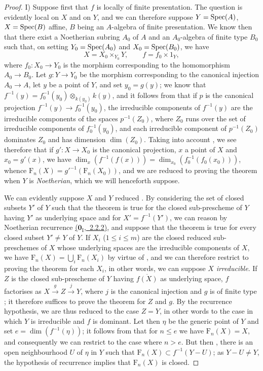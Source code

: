 \begin{proof}
I) Suppose first that $f$ is locally of finite presentation.
The question is evidently local on $X$ and on $Y$, and we can therefore suppose $Y=\operatorname{Spec}(A)$, $X=\operatorname{Spec}(B)$ affine, $B$ being an $A$-algebra of finite presentation.
We know then  that there exist a Noetherian subring $A_0$ of $A$ and an $A_0$-algebra of finite type $B_0$ such that, on setting $Y_0=\operatorname{Spec}(A_0)$ and $X_0=\operatorname{Spec}(B_0)$, we have
\[
X=X_0\times_{Y_0}Y,\qquad f=f_0\times 1_Y,
\]
where $f_0:X_0\to Y_0$ is the morphism corresponding to the homomorphism $A_0\to B_0$.
Let $g:Y\to Y_0$ be the morphism corresponding to the canonical injection $A_0\to A$, let $y$ be a point of $Y$, and set $y_0=g(y)$; we know that $f^{-1}(y)=f_0^{-1}(y_0)\otimes_{k(y_0)}k(y)$, and it follows from  that if $p$ is the canonical projection $f^{-1}(y)\to f_0^{-1}(y_0)$, the irreducible components of $f^{-1}(y)$ are the irreducible components of the spaces $p^{-1}(Z_0)$, where $Z_0$ runs over the set of irreducible components of $f_0^{-1}(y_0)$, and each irreducible component of $p^{-1}(Z_0)$ dominates $Z_0$ and has dimension $\dim(Z_0)$.
Taking into account , we see therefore that if $g':X\to X_0$ is the canonical projection, $x$ a point of $X$ and $x_0=g'(x)$, we have $\dim_x(f^{-1}(f(x)))=\dim_{x_0}(f_0^{-1}(f_0(x_0)))$, whence $\mathrm{F}_n(X)={g'}^{-1}(\mathrm{F}_n(X_0))$, and we are reduced to proving the theorem when $Y$ is \emph{Noetherian}, which we will henceforth suppose.

We can evidently suppose $X$ and $Y$ reduced .
By considering the set of closed subsets $Y'$ of $Y$ such that the theorem is true for the closed sub-prescheme of $Y$ having $Y'$ as underlying space and for $X'=f^{-1}(Y')$, we can reason by Noetherian recurrence \hyperref[0.2.2.2]{($\mathbf{0}_{\mathrm{I}}$,~2.2.2)}, and suppose that the theorem is true for every closed subset $Y'\neq Y$ of $Y$.
If $X_i$ ($1\leq i\leq m$) are the closed reduced sub-preschemes of $X$ whose underlying spaces are the irreducible components of $X$, we have $\mathrm{F}_n(X)=\bigcup_i\mathrm{F}_n(X_i)$ by virtue of , and we can therefore restrict to proving the theorem for each $X_i$, in other words, we can suppose $X$ \emph{irreducible}.
If $Z$ is the closed sub-prescheme of $Y$ having $\overline{f(X)}$ as underlying space, $f$ factorises as $X\xrightarrow{g}Z\xrightarrow{j}Y$, where $j$ is the canonical injection  and $g$ is of finite type ; it therefore suffices to prove the theorem for $Z$ and $g$. By the recurrence hypothesis, we are thus reduced to the case $Z=Y$, in other words to the case in which $Y$ is irreducible and $f$ is dominant.
Let then $\eta$ be the generic point of $Y$ and set $e=\dim(f^{-1}(\eta))$; it follows from  that for $n\leq e$ we have $\mathrm{F}_n(X)=X$, and consequently we can restrict to the case where $n>e$.
But then , there is an open neighbourhood $U$ of $\eta$ in $Y$ such that $\mathrm{F}_n(X)\subset f^{-1}(Y-U)$; as $Y-U\neq Y$, the hypothesis of recurrence implies that $\mathrm{F}_n(X)$ is closed.


\end{proof}
